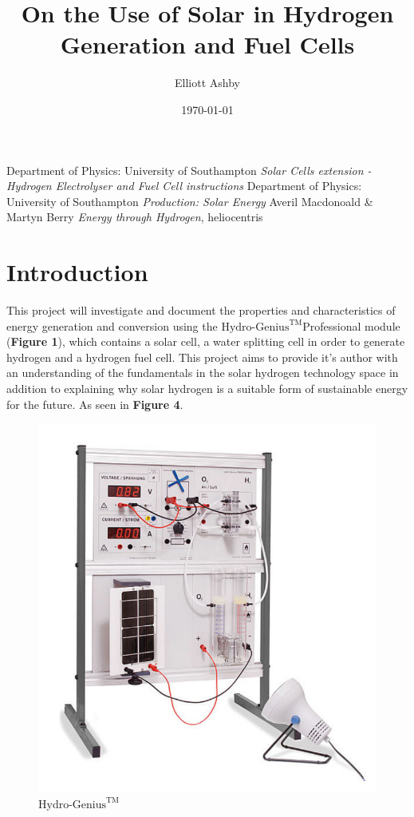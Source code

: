 \documentclass{article}
\title{On the Use of Solar in Hydrogen Generation and Fuel Cells}
\author{Elliott Ashby}
\date{\today}
\begin{document}
    \maketitle
    \begin{thebibliography}{3}
        Department of Physics: University of Southampton \emph{Solar Cells extension - Hydrogen Electrolyser and Fuel Cell instructions}
        Department of Physics: University of Southampton \emph{Production: Solar Energy}
        Averil Macdonoald \& Martyn Berry \emph{Energy through Hydrogen}, heliocentris
    \end{thebibliography}
    \section{Introduction}

    This project will investigate and document the properties and characteristics
    of energy generation and conversion using the \(\text{Hydro-Genius}^{\text{TM}}\)Professional module (\textbf{Figure 1}), 
    which contains a solar cell, a water splitting cell in order to generate hydrogen and 
    a hydrogen fuel cell. This project aims to provide it's author with an understanding 
    of the fundamentals in the solar hydrogen technology space in addition to explaining 
    why solar hydrogen is a suitable form of sustainable energy for the future. As seen in \textbf{Figure 4}.
    \begin{figure}
        \centering
        \includegraphics[scale=0.3]{./module.png}
        \caption{\(\text{Hydro-Genius}^{\text{TM}}\)\cite{SCE}}
    \end{figure}
\end{document}
